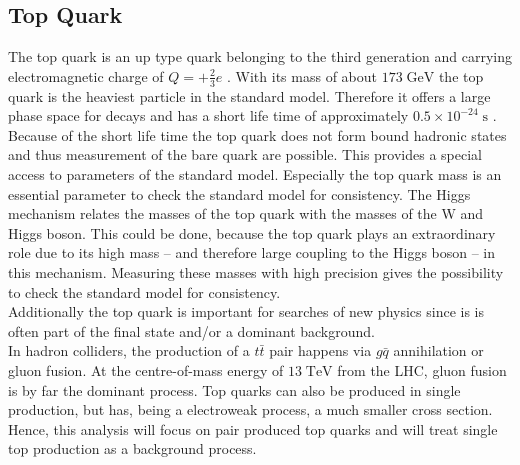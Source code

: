 \subsection{Top Quark}
	The top quark is an up type quark belonging to the third generation and carrying electromagnetic charge of $Q=+\frac{2}{3}e$ \cite{pdg2016}. With its mass of about $173\;\text{GeV}$ the top quark is the heaviest particle in the standard model. Therefore it offers a large phase space for decays and  has a short life time of approximately $0.5 \times 10^{-24}\;\text{s}$ \cite{pdg2016}. Because of the short life time the top quark does not form bound hadronic states and thus measurement of the bare quark are possible. This provides a special access to parameters of the standard model. Especially the top quark mass is an essential parameter to check the standard model for consistency. The Higgs mechanism relates the masses of the top quark with the masses of the W and Higgs boson. This could be done, because the top quark plays an extraordinary role due to its high mass -- and therefore large coupling to the Higgs boson -- in this mechanism. Measuring these masses with high precision gives the possibility to check the standard model for consistency. 
	\\
	Additionally the top quark is important for searches of new physics since is is often part of the final state and/or a dominant background. 
	\\
	In hadron colliders, the production of a $t\bar{t}$ pair happens via $g\bar{q}$ annihilation or gluon fusion. At the centre-of-mass energy of $13\;\text{TeV}$ from the LHC, gluon fusion is by far the dominant process. Top quarks can also be produced in single production, but has, being a electroweak process, a much smaller cross section. Hence, this analysis will focus on pair produced top quarks and will treat single top production as a background process.

